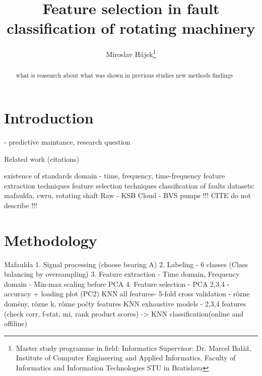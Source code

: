 \documentclass{llncs}
\begin{document}
\title{Feature selection in fault classification of rotating machinery}


\author{
	Miroslav Hájek\thanks{Master study programme in field: Informatics
	Supervisor: Dr. Marcel Baláž, Institute of Computer Engineering and Applied Informatics, Faculty of Informatics and Information Technologies STU in Bratislava }
}


\maketitle 

\begin{abstract}

what is reasearch about
what was shown in previous studies
new methods
findings

\end{abstract}


\section{Introduction}
- predictive maintance, research question

Related work (citations)

existence of standards
domain - time, frequency, time-frequency
feature extraction techniques
feature selection techniques
classification of faults
datasets: mafaulda, cwru, rotating shaft
Raw - KSB Cloud - BVS pumps
!!! CITE do not describe !!!

\section{Methodology}

Mafaulda
1. Signal processing (choose bearing A)
2. Labeling - 6 classes (Class balancing by oversampling)
3. Feature extraction - Time domain, Frequency domain - Min-max scaling before PCA
4. Feature selection - 
	PCA 2,3,4 - accuracy + loading plot (PC2)
	KNN all features- 5-fold cross validation - rôzne domény, rôzne k, rôzne počty features
	KNN exhaustive models - 
		2,3,4 features (check corr, f-stat, mi, rank product scores)
	 -> KNN classification(online and offiline)
\end{document}

